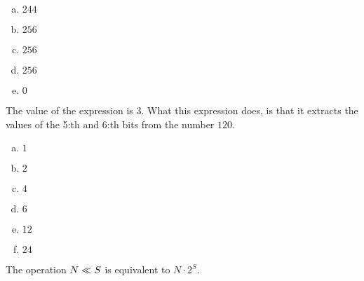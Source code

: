 \begin{Answer}[ref={bitnot}]
  \begin{enumerate}[(a)]
  \item $244$
  \item $256$
  \item $256$
  \item $256$
  \item $0$
  \end{enumerate}
\end{Answer}

\begin{Answer}[ref={bit-shiting}]

  The value of the expression is $3$. What this expression does, is
  that it extracts the values of the 5:th and 6:th bits from the
  number $120$.

\end{Answer}

\begin{Answer}[ref={bit-equiv}]

  \begin{enumerate}[(a)]
  \item $1$
  \item $2$
  \item $4$
  \item $6$
  \item $12$
  \item $24$
  \end{enumerate}

  The operation $N \ll S$ is equivalent to $N \cdot 2^S$.

\end{Answer}

\begin{Answer}[ref={bitcount}]

  \begin{algorithmic}[1]

    \State {}
    \EndIf
    \EndFor

    \EndProcedure
  \end{algorithmic}

\end{Answer}

